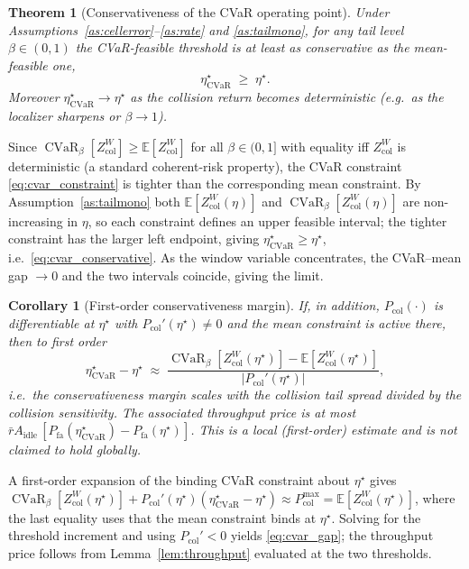 \documentclass[journal]{IEEEtran}
\newtheorem{theorem}{Theorem}
\newtheorem{corollary}{Corollary}
\newcommand{\E}{\mathbb{E}}
\newcommand{\Pfa}{P_{\mathrm{fa}}}         %
\newcommand{\thr}{\eta}                    %
\newcommand{\Pcol}{P_{\mathrm{col}}}       %
\newcommand{\Pcolmax}{P_{\mathrm{col}}^{\max}} %
\newcommand{\Zcol}{Z_{\mathrm{col}}}        %
\DeclareMathOperator{\CVaR}{CVaR}
\newcommand{\cvarcol}{\beta}                %
\newcommand{\thrcvar}{\thr^{\star}_{\mathrm{CVaR}}} %
\begin{document}
\begin{theorem}[Conservativeness of the CVaR operating point]
\label{thm:cvar}
Under Assumptions~\ref{as:cellerror}--\ref{as:rate} and
\ref{as:tailmono}, for any tail level $\cvarcol\in(0,1)$ the CVaR-feasible
threshold is at least as conservative as the mean-feasible one,
\begin{equation}
\thrcvar \;\ge\; \thr^{\star}.
\label{eq:cvar_conservative}
\end{equation}
Moreover $\thrcvar\to\thr^{\star}$ as the collision return becomes
deterministic (e.g.\ as the localizer sharpens or $\cvarcol\to1$).
\end{theorem}

\begin{IEEEproof}
Since $\CVaR_{\cvarcol}[\Zcol^{W}]\ge\E[\Zcol^{W}]$ for all
$\cvarcol\in(0,1]$ with equality iff $\Zcol^{W}$ is deterministic (a standard
coherent-risk property), the CVaR constraint \eqref{eq:cvar_constraint} is
tighter than the corresponding mean constraint. By
Assumption~\ref{as:tailmono} both $\E[\Zcol^{W}(\thr)]$ and
$\CVaR_{\cvarcol}[\Zcol^{W}(\thr)]$ are non-increasing in $\thr$, so each
constraint defines an upper feasible interval; the tighter constraint has the
larger left endpoint, giving $\thrcvar\ge\thr^{\star}$, i.e.\
\eqref{eq:cvar_conservative}. As the window variable concentrates, the
CVaR--mean gap $\to 0$ and the two intervals coincide, giving the limit.
\end{IEEEproof}

\begin{corollary}[First-order conservativeness margin]
\label{cor:cvargap}
If, in addition, $\Pcol(\cdot)$ is differentiable at $\thr^\star$ with
$\Pcol'(\thr^\star)\neq 0$ and the mean constraint is active there, then to
first order
\begin{equation}
\thrcvar-\thr^{\star}\;\approx\;
\frac{\CVaR_{\cvarcol}[\Zcol^{W}(\thr^{\star})]-\E[\Zcol^{W}(\thr^{\star})]}
{\bigl|\Pcol'(\thr^{\star})\bigr|},
\label{eq:cvar_gap}
\end{equation}
i.e.\ the conservativeness margin scales with the collision tail spread
divided by the collision sensitivity. The associated throughput price is at
most $\bar r A_{\mathrm{idle}}\,[\Pfa(\thrcvar)-\Pfa(\thr^{\star})]$. This is
a local (first-order) estimate and is not claimed to hold globally.
\end{corollary}

\begin{IEEEproof}
A first-order expansion of the binding CVaR constraint about $\thr^{\star}$
gives $\CVaR_{\cvarcol}[\Zcol^{W}(\thr^{\star})]
+\Pcol'(\thr^{\star})(\thrcvar-\thr^{\star})\approx\Pcolmax
=\E[\Zcol^{W}(\thr^{\star})]$, where the last equality uses that the mean
constraint binds at $\thr^{\star}$. Solving for the threshold increment and
using $\Pcol'<0$ yields \eqref{eq:cvar_gap}; the throughput price follows
from Lemma~\ref{lem:throughput} evaluated at the two thresholds.
\end{IEEEproof}
\end{document}
